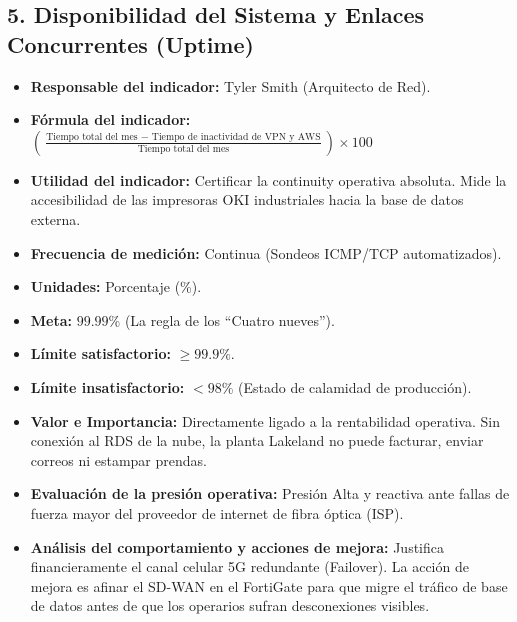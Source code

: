 \documentclass[11pt,a4paper]{article}
\begin{document}
\subsection{5. Disponibilidad del Sistema y Enlaces Concurrentes (Uptime)}
\begin{itemize}[label={--}, itemsep=0.1cm]
    \item \textbf{Responsable del indicador:} Tyler Smith (Arquitecto de Red).
    \item \textbf{Fórmula del indicador:} $\left(\frac{\text{Tiempo total del mes } - \text{ Tiempo de inactividad de VPN y AWS}}{\text{Tiempo total del mes}}\right) \times 100$
    \item \textbf{Utilidad del indicador:} Certificar la continuity operativa absoluta. Mide la accesibilidad de las impresoras OKI industriales hacia la base de datos externa.
    \item \textbf{Frecuencia de medición:} Continua (Sondeos ICMP/TCP automatizados).
    \item \textbf{Unidades:} Porcentaje (\%).
    \item \textbf{Meta:} $99.99\%$ (La regla de los \enquote{Cuatro nueves}).
    \item \textbf{Límite satisfactorio:} $\geq 99.9\%$.
    \item \textbf{Límite insatisfactorio:} $< 98\%$ (Estado de calamidad de producción).
    \item \textbf{Valor e Importancia:} Directamente ligado a la rentabilidad operativa. Sin conexión al RDS de la nube, la planta Lakeland no puede facturar, enviar correos ni estampar prendas.
    \item \textbf{Evaluación de la presión operativa:} Presión Alta y reactiva ante fallas de fuerza mayor del proveedor de internet de fibra óptica (ISP).
    \item \textbf{Análisis del comportamiento y acciones de mejora:} Justifica financieramente el canal celular 5G redundante (Failover). La acción de mejora es afinar el SD-WAN en el FortiGate para que migre el tráfico de base de datos antes de que los operarios sufran desconexiones visibles.
\end{itemize}
\end{document}
